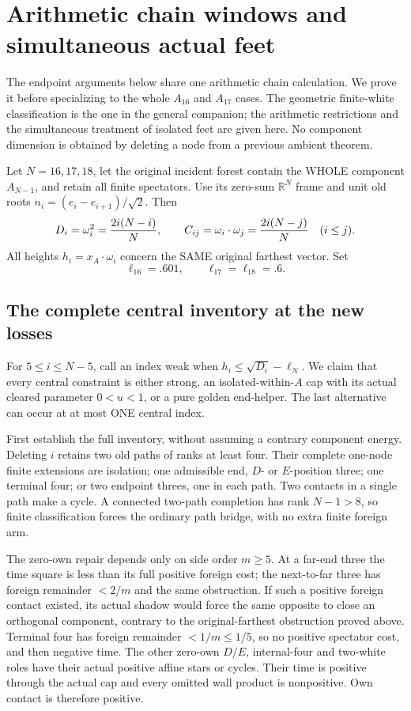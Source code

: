 \documentclass[11pt]{article}
\begin{document}
\section{Arithmetic chain windows and simultaneous actual feet}
\label{app:arithmeticchain}

The endpoint arguments below share one arithmetic chain calculation.
We prove it before specializing to the whole \(A_{16}\) and
\(A_{17}\) cases.  The geometric finite-white classification is the
one in the general companion; the arithmetic restrictions and the
simultaneous treatment of isolated feet are given here.
No component dimension is obtained by deleting a node from a
previous ambient theorem.

Let \(N=16,17,18\), let the original incident forest contain the
WHOLE component \(A_{N-1}\), and retain all finite spectators.
Use its zero-sum \(\mathbb R^N\) frame and unit old roots
\(n_i=(e_i-e_{i+1})/\sqrt2\).  Then
\[
 D_i=\omega_i^2={2i(N-i)\over N},\qquad
 C_{ij}=\omega_i\cdot\omega_j={2i(N-j)\over N}\quad(i\le j).
\]
All heights \(h_i=x_A\cdot\omega_i\) concern the SAME original
farthest vector.  Set
\[
             \ell_{16}=.601,\qquad\ell_{17}=\ell_{18}=.6.
\]

\subsection{The complete central inventory at the new losses}
\label{app:arithchaininventory}

For \(5\le i\le N-5\), call an index weak when
\(h_i\le\sqrt{D_i}-\ell_N\).
We claim that every central constraint is either strong, an
isolated-within-\(A\) cap with its actual cleared parameter
\(0<u<1\), or a pure golden end-helper.
The last alternative can occur at at most ONE central index.

First establish the full inventory, without assuming a contrary
component energy.  Deleting \(i\) retains two old paths of ranks
at least four.  Their complete one-node finite extensions are
isolation; one admissible end, \(D\)- or \(E\)-position three;
one terminal four; or two endpoint threes, one in each path.
Two contacts in a single path make a cycle.
A connected two-path completion has rank \(N-1>8\), so finite
classification forces the ordinary path bridge, with no extra
finite foreign arm.

The zero-own repair depends only on side order \(m\ge5\).
At a far-end three the time square is less than its full positive
foreign cost; the next-to-far three has foreign remainder \(<2/m\)
and the same obstruction.
If such a positive foreign contact existed, its actual shadow
would force the same opposite to close an orthogonal component,
contrary to the original-farthest obstruction proved above.
Terminal four has foreign remainder \(<1/m\le1/5\), so no positive
spectator cost, and then negative time.
The other zero-own \(D/E\), internal-four and two-white roles
have their actual positive affine stars or cycles.
Their time is positive through the actual cap and every omitted
wall product is nonpositive.  Own contact is therefore positive.
\end{document}
